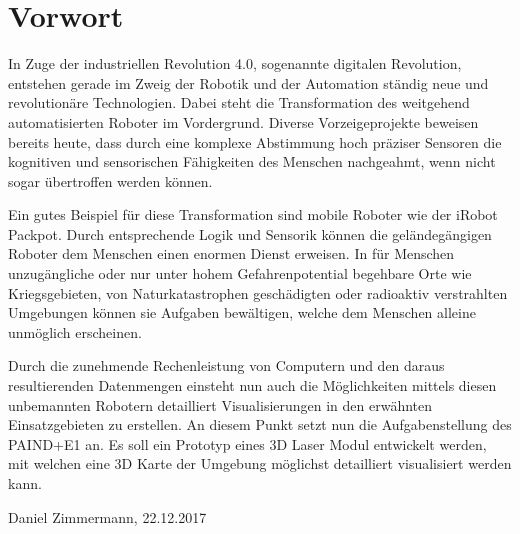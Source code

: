 \chapter*{Vorwort}
\label{chap:Vorwort}

In Zuge der industriellen Revolution 4.0, sogenannte digitalen Revolution, entstehen gerade im Zweig der Robotik und der Automation ständig neue und revolutionäre Technologien. Dabei steht die Transformation des weitgehend automatisierten Roboter im Vordergrund. Diverse Vorzeigeprojekte beweisen bereits heute, dass durch eine komplexe Abstimmung hoch präziser Sensoren die kognitiven und sensorischen Fähigkeiten des Menschen nachgeahmt, wenn nicht sogar übertroffen werden können.

Ein gutes Beispiel für diese Transformation sind mobile Roboter wie der iRobot Packpot. Durch entsprechende Logik und Sensorik können die geländegängigen Roboter dem Menschen einen enormen Dienst erweisen. In für Menschen unzugängliche oder nur unter hohem Gefahrenpotential begehbare Orte wie Kriegsgebieten, von Naturkatastrophen geschädigten oder radioaktiv verstrahlten Umgebungen können sie Aufgaben bewältigen, welche dem Menschen alleine unmöglich erscheinen.

Durch die zunehmende Rechenleistung von Computern und den daraus resultierenden Datenmengen einsteht nun auch die Möglichkeiten mittels diesen unbemannten Robotern detailliert Visualisierungen in den erwähnten Einsatzgebieten zu erstellen. An diesem Punkt setzt nun die Aufgabenstellung des PAIND+E1 an. Es soll ein Prototyp eines 3D Laser Modul entwickelt werden, mit welchen eine 3D Karte der Umgebung möglichst detailliert visualisiert werden kann.

Daniel Zimmermann, 22.12.2017









 






